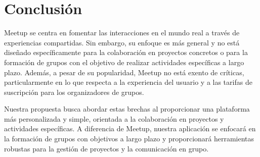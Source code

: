 \section{Conclusión}

Meetup se centra en fomentar las interacciones en el mundo real a 
través de experiencias compartidas. Sin embargo, su enfoque es más 
general y no está diseñado específicamente para la colaboración en 
proyectos concretos o para la formación de grupos con el objetivo de 
realizar actividades específicas a largo plazo. Además, a pesar de su 
popularidad, Meetup no está exento de críticas, particularmente en lo 
que respecta a la experiencia del usuario y a las tarifas de suscripción 
para los organizadores de grupos.

Nuestra propuesta busca abordar estas brechas al proporcionar una 
plataforma más personalizada y simple, orientada a la colaboración en proyectos y 
actividades específicas. A diferencia de Meetup, nuestra aplicación se 
enfocará en la formación de grupos con objetivos a largo plazo y proporcionará 
herramientas robustas para la gestión de proyectos y la comunicación en grupo.
